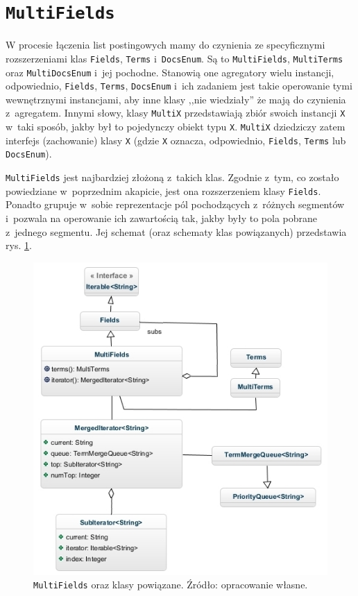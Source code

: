 \section{\texttt{MultiFields}}

W procesie łączenia list postingowych mamy do czynienia ze specyficznymi rozszerzeniami klas \texttt{Fields}, \texttt{Terms} i~\texttt{DocsEnum}. Są to \texttt{MultiFields}, \texttt{MultiTerms} oraz \texttt{MultiDocsEnum} i~jej pochodne. Stanowią one agregatory wielu instancji, odpowiednio, \texttt{Fields}, \texttt{Terms}, \texttt{DocsEnum} i~ich zadaniem jest takie operowanie tymi wewnętrznymi instancjami, aby inne klasy ,,nie wiedziały'' że mają do czynienia z~agregatem. Innymi słowy, klasy \texttt{MultiX} przedstawiają zbiór swoich instancji \texttt{X} w~taki sposób, jakby był to pojedynczy obiekt typu \texttt{X}. \texttt{MultiX} dziedziczy zatem interfejs (zachowanie) klasy \texttt{X} (gdzie \texttt{X} oznacza, odpowiednio, \texttt{Fields}, \texttt{Terms} lub \texttt{DocsEnum}).

\texttt{MultiFields} jest najbardziej złożoną z~takich klas. Zgodnie z~tym, co zostało powiedziane w~poprzednim akapicie, jest ona rozszerzeniem klasy \texttt{Fields}. Ponadto grupuje w~sobie reprezentacje pól pochodzących z~różnych segmentów i~pozwala na operowanie ich zawartością tak, jakby były to pola pobrane z~jednego segmentu. Jej schemat (oraz schematy klas powiązanych) przedstawia rys. \ref{multiFields}.

\begin{figure}[here]
 \includegraphics[scale=0.65]{pictures/MultiFields_2.jpg}
 \caption{\texttt{MultiFields} oraz klasy powiązane. Źródło: opracowanie własne.\label{multiFields}}
\end{figure}

